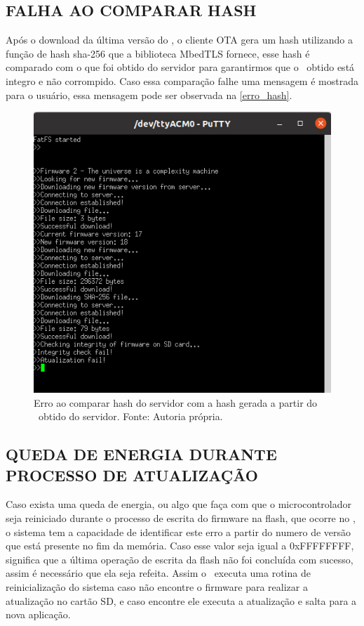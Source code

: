 \subsection{FALHA AO COMPARAR HASH}
Após o download da última versão do \firmware, o cliente OTA gera um hash utilizando a função de hash sha-256 que a biblioteca MbedTLS fornece, esse hash é comparado com o que foi obtido do servidor para garantirmos que o \firmware\ obtido está integro e não corrompido. Caso essa comparação falhe uma mensagem é mostrada para o usuário, essa mensagem pode ser observada na \autoref{erro_hash}.
\begin{figure}[H]
    \scriptsize
     \centering
     \includegraphics[scale=1.2]{dados/figuras/hash_error.png}
     \caption{Erro ao comparar hash do servidor com a hash gerada a partir do \firmware\ obtido do servidor. \newline Fonte: Autoria própria.}
     \label{erro_hash}
\end{figure}
\subsection{QUEDA DE ENERGIA DURANTE PROCESSO DE ATUALIZAÇÃO}
Caso exista uma queda de energia, ou algo que faça com que o microcontrolador seja reiniciado durante o processo de escrita do firmware na flash, que ocorre no \bootloader, o sistema tem a capacidade de identificar este erro a partir do numero de versão que está presente no fim da memória. Caso esse valor seja igual a 0xFFFFFFFF, significa que a última operação de escrita da flash não foi concluída com sucesso, assim é necessário que ela seja refeita. Assim o \bootloader\ executa uma rotina de reinicialização do sistema caso não encontre o firmware para realizar a atualização no cartão SD, e caso encontre ele executa a atualização e salta para a nova aplicação.


